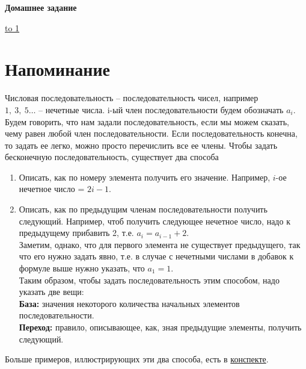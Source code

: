 \documentclass[12pt]{article} %
\begin{document}
	
	\begin{center}
		{\Large\bf
			Домашнее задание
		}
	\end{center}
	\vspace*{-1em}\noindent \underline{\hbox to 1\textwidth{{ } \hfil{ } \hfil{ } }}
	\section*{Напоминание}
	Числовая последовательность -- последовательность чисел, например\\ $1,\ 3,\ 5\ldots$ -- нечетные числа. i-ый член последовательности будем обозначать $a_i$. Будем говорить, что нам задали последовательность, если мы можем сказать, чему равен любой член последовательности. Если последовательность конечна, то задать ее легко, можно просто перечислить все ее члены. Чтобы задать бесконечную последовательность, существует два способа
	\begin{enumerate}
		\item Описать, как по номеру элемента получить его значение. Например, $i$-ое нечетное число = $2i - 1$. 
		\item Описать, как по предыдущим членам последовательности получить следующий. Например, чтоб получить следующее нечетное число, надо к предыдущему прибавить 2, т.е. $a_i = a_{i - 1} + 2$.\\
		Заметим, однако, что для первого элемента не существует предыдущего, так что его нужно задать явно, т.е. в случае с нечетными числами в добавок к формуле выше нужно указать, что $a_1 = 1$.\\
		Таким образом, чтобы задать последовательность этим способом, надо указать две вещи:\\
		\textbf{База:} значения некоторого количества начальных элементов последовательности.\\
		\textbf{Переход:} правило, описывающее, как, зная предыдущие элементы, получить следующий.\\		
	\end{enumerate}
	Больше примеров, иллюстрирующих эти два способа, есть в  \href{https://informatics.msk.ru/file.php/3097/lesson6conspect.pdf}{конспекте}. 
	
	\newpage
\end{document}
